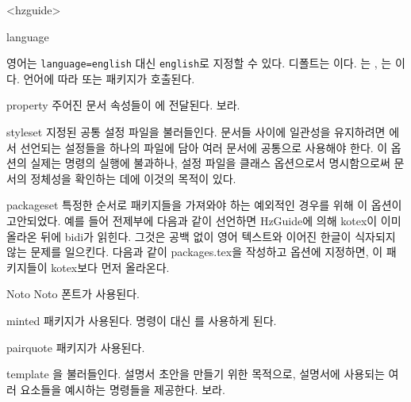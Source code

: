 \documentclass[pairquote, minted]{hzguide}
\begin{document}
\begin{macros}<hzguide>
\item[language] 

영어는 \texttt{language=english} 대신 \texttt{english}로 지정할 수 있다.
디폴트는 이다. 
는 , 는 이다.
언어에 따라  또는  패키지가 호출된다.

\item[property] 
주어진 문서 속성들이 \macro{\DocumentSetup}에 전달된다.
\를 보라.

\item[styleset] 
지정된 공통 설정 파일을 불러들인다.
문서들 사이에 일관성을 유지하려면 에서 선언되는 설정들을 하나의 파일에 담아 여러 문서에 공통으로 사용해야 한다.
이 옵션의 실제는 \macro{} 명령의 실행에 불과하나, 설정 파일을 클래스 옵션으로서 명시함으로써 문서의 정체성을 확인하는 데에 이것의 목적이 있다.

\item[packageset] 
특정한 순서로 패키지들을 가져와야 하는 예외적인 경우를 위해 이 옵션이 고안되었다.
예를 들어 전제부에 다음과 같이 선언하면 HzGuide에 의해 kotex이 이미 올라온 뒤에 bidi가 읽힌다.
그것은 공백 없이 영어 텍스트와 이어진 한글이 식자되지 않는 문제를 일으킨다. 
다음과 같이 packages.tex을 작성하고  옵션에 지정하면, 이 패키지들이 kotex보다 먼저 올라온다.

\begin{code}
\usepackage{stackengine}
\usepackage{ulem}
\usepackage{bidi}
\end{code}


\item[Noto] \keyvalueTF
Noto 폰트가 사용된다.

\item[minted] \keyvalueTF
{} 패키지가 사용된다. \macro{\coderead} 명령이 \macro{} 대신 를 사용하게 된다.

\item[pairquote] \keyvalueTF
{} 패키지가 사용된다.

\item[template] \keyvalueTF
{}을 불러들인다. 설명서 초안을 만들기 위한 목적으로, 설명서에 사용되는 여러 요소들을 예시하는 명령들을 제공한다.
\을 보라.
\end{macros}
\end{document}
